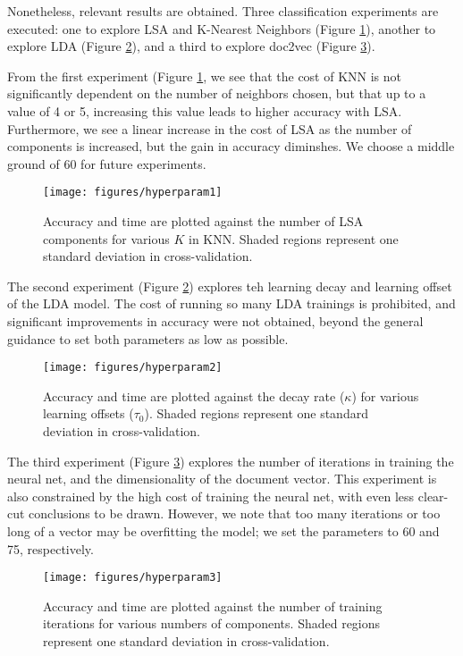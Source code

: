 \documentclass[]{article}
\begin{document}
Nonetheless, relevant results are obtained. Three classification experiments are executed: one to explore LSA and K-Nearest Neighbors (Figure \ref{fig:LSA_KNN}), another to explore LDA (Figure \ref{fig:LDA}), and a third to explore doc2vec (Figure \ref{fig:doc2vec}).

From the first experiment (Figure \ref{fig:LSA_KNN}, we see that the cost of KNN is not significantly dependent on the number of neighbors chosen, but that up to a value of 4 or 5, increasing this value leads to higher accuracy with LSA. Furthermore, we see a linear increase in the cost of LSA as the number of components is increased, but the gain in accuracy diminshes. We choose a middle ground of 60 for future experiments.

	\begin{figure}[htbp!]
		\centering
		\texttt{[image: figures/hyperparam1]}
		\caption{Accuracy and time are plotted against the number of LSA components for various $K$ in KNN. Shaded regions represent one standard deviation in cross-validation.}
		\label{fig:LSA_KNN}
	\end{figure}
	
The second experiment (Figure \ref{fig:LDA}) explores teh learning decay and learning offset of the LDA model. The cost of running so many LDA trainings is prohibited, and significant improvements in accuracy were not obtained, beyond the general guidance to set both parameters as low as possible.
	
	\begin{figure}[htbp!]
		\centering
		\texttt{[image: figures/hyperparam2]}
		\caption{Accuracy and time are plotted against the decay rate ($\kappa$) for various learning offsets ($\tau_0$). Shaded regions represent one standard deviation in cross-validation.}
		\label{fig:LDA}
	\end{figure}
	
The third experiment (Figure \ref{fig:doc2vec}) explores the number of iterations in training the neural net, and the dimensionality of the document vector. This experiment is also constrained by the high cost of training the neural net, with even less clear-cut conclusions to be drawn. However, we note that too many iterations or too long of a vector may be overfitting the model; we set the parameters to 60 and 75, respectively.

	\begin{figure}[htbp!]
		\centering
		\texttt{[image: figures/hyperparam3]}
		\caption{Accuracy and time are plotted against the number of training iterations for various numbers of components. Shaded regions represent  one standard deviation in cross-validation.}
		\label{fig:doc2vec}
	\end{figure}
	
\end{document}
